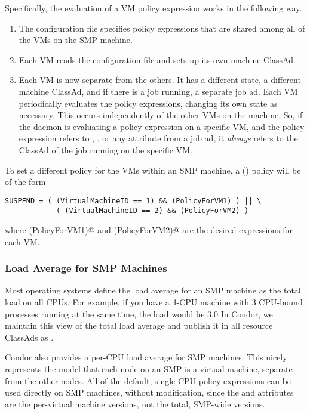 Specifically, the evaluation of a VM policy expression works in
the following way.
\begin{enumerate}
\item 
The configuration file specifies policy expressions that are shared among
all of the VMs on the SMP machine.
\item 
Each VM reads the configuration file and sets up its own machine ClassAd.
\item 
Each VM is now separate from the others.  It has a
different state, a different machine ClassAd, and if there is a job
running, a separate job ad.
Each VM periodically
evaluates the policy expressions, changing its own state
as necessary.
This occurs independently of the other VMs on the machine.
So, if the  daemon is evaluating a policy expression
on a specific VM,
and the policy expression refers to , ,
or any attribute from a job ad,
it \emph{always} refers to the ClassAd of the
job running on the specific VM.
\end{enumerate}

To set a different policy for the VMs within an SMP machine,
a (\verb@SUSPEND@) policy will be of the form
\begin{verbatim}
SUSPEND = ( (VirtualMachineID == 1) && (PolicyForVM1) ) || \
            ( (VirtualMachineID == 2) && (PolicyForVM2) )
\end{verbatim}
where \verb@(PolicyForVM1)@ and \verb@(PolicyForVM2)@ are the
desired expressions for each VM.

\subsubsection{\label{sec:SMP-Load}
Load Average for SMP Machines}

Most operating systems define the load average for an SMP machine as
the total load on all CPUs.
For example, if you have a 4-CPU machine with 3 CPU-bound processes
running at the same time, the load would be 3.0
In Condor, we maintain this view of the total load average and publish
it in all resource ClassAds as \Attr{TotalLoadAvg}.

Condor also provides a per-CPU load average for SMP machines.
This nicely represents the model that each node on an SMP is a virtual machine,
separate from the other nodes.
All of the default, single-CPU policy expressions can be used directly
on SMP machines, without modification, since the \Attr{LoadAvg} and
\Attr{CondorLoadAvg} attributes are the per-virtual machine versions,
not the total, SMP-wide versions.

